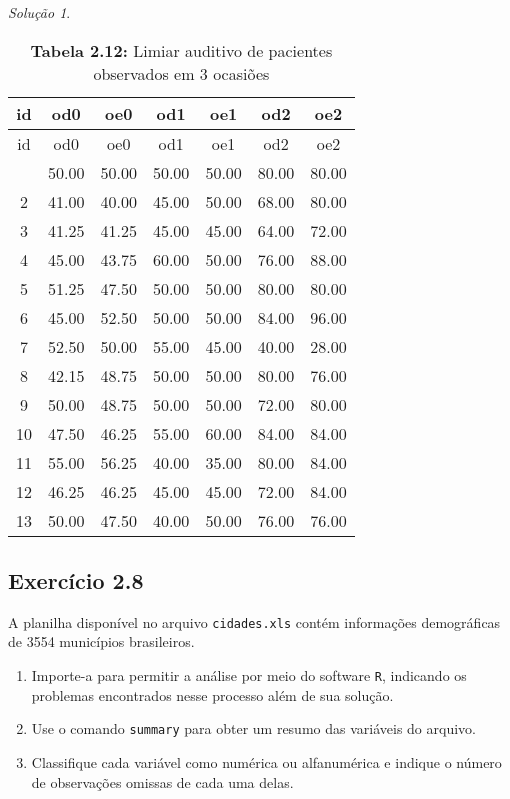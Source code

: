 \documentclass[
]{latex/krantz}
\providecommand{\tightlist}{%
  \setlength{\itemsep}{0pt}\setlength{\parskip}{0pt}}
\theoremstyle{definition}
\theoremstyle{definition}
\theoremstyle{definition}
\theoremstyle{definition}
\theoremstyle{remark}
\newtheorem*{solution}{Solução}
\begin{document}
\begin{solution}
\begin{longtable}[]{@{}ccccccc@{}}
\caption{\textbf{Tabela 2.12:} Limiar auditivo de pacientes observados em 3 ocasiões}\tabularnewline
\toprule\noalign{}
id & od0 & oe0 & od1 & oe1 & od2 & oe2 \\
\midrule\noalign{}
\endfirsthead
\toprule\noalign{}
id & od0 & oe0 & od1 & oe1 & od2 & oe2 \\
\midrule\noalign{}
\endhead
\bottomrule\noalign{}
\endlastfoot
1 & 50.00 & 50.00 & 50.00 & 50.00 & 80.00 & 80.00 \\
2 & 41.00 & 40.00 & 45.00 & 50.00 & 68.00 & 80.00 \\
3 & 41.25 & 41.25 & 45.00 & 45.00 & 64.00 & 72.00 \\
4 & 45.00 & 43.75 & 60.00 & 50.00 & 76.00 & 88.00 \\
5 & 51.25 & 47.50 & 50.00 & 50.00 & 80.00 & 80.00 \\
6 & 45.00 & 52.50 & 50.00 & 50.00 & 84.00 & 96.00 \\
7 & 52.50 & 50.00 & 55.00 & 45.00 & 40.00 & 28.00 \\
8 & 42.15 & 48.75 & 50.00 & 50.00 & 80.00 & 76.00 \\
9 & 50.00 & 48.75 & 50.00 & 50.00 & 72.00 & 80.00 \\
10 & 47.50 & 46.25 & 55.00 & 60.00 & 84.00 & 84.00 \\
11 & 55.00 & 56.25 & 40.00 & 35.00 & 80.00 & 84.00 \\
12 & 46.25 & 46.25 & 45.00 & 45.00 & 72.00 & 84.00 \\
13 & 50.00 & 47.50 & 40.00 & 50.00 & 76.00 & 76.00 \\
\end{longtable}

\end{solution}

\hypertarget{exr2-8}{%
\subsection*{Exercício 2.8}\label{exr2-8}}

A planilha disponível no arquivo \texttt{cidades.xls} contém informações demográficas de 3554 municípios brasileiros.

\begin{enumerate}
\def\labelenumi{\alph{enumi})}
\tightlist
\item
  Importe-a para permitir a análise por meio do software \texttt{R}, indicando os problemas encontrados nesse processo além de sua solução.
\item
  Use o comando \texttt{summary} para obter um resumo das variáveis do arquivo.
\item
  Classifique cada variável como numérica ou alfanumérica e indique o número de observações omissas de cada uma delas.
\end{enumerate}
\end{document}
